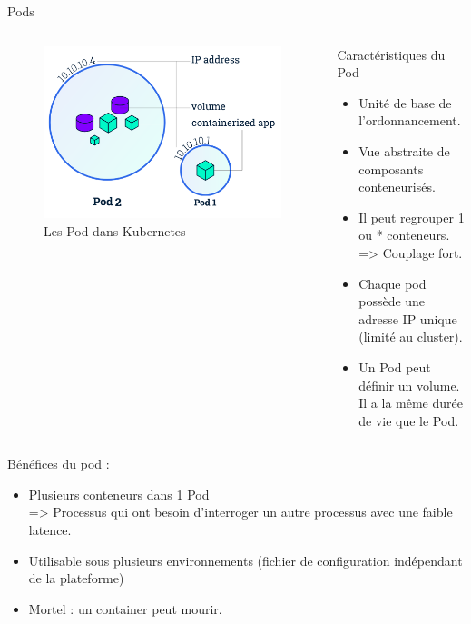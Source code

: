 \documentclass{bredelebeamer}
\begin{document}
\begin{frame}{Pods}

\begin{columns}
\begin{column}{0.5\textwidth}
\begin{figure}
\centering
\includegraphics[scale=0.25]{images/img7.png}
\caption{Les Pod dans Kubernetes}
\end{figure}
\end{column}
\begin{column}{0.5\textwidth}
\begin{block}{Caractéristiques du Pod}

\begin{itemize}
\item Unité de base de l'ordonnancement. 											\pause
\item Vue abstraite de composants conteneurisés.								\pause
\item Il peut regrouper 1 ou * conteneurs. \\=> Couplage fort.				\pause
\item Chaque pod possède une adresse IP unique (limité au cluster).		\pause
\item Un Pod peut définir un volume. 
		Il a la même durée de vie que le Pod.
\end{itemize}
\end{block}																							\pause
\end{column}



\end{columns}
\vspace{4px}
Bénéfices du pod : 
\begin{itemize}
\item Plusieurs conteneurs dans 1 Pod\\
=> Processus qui ont besoin d'interroger un autre processus avec une faible latence.		\pause
\item Utilisable sous plusieurs environnements (fichier de configuration indépendant de la plateforme)		\pause
\item Mortel : un container peut mourir.		\pause
\end{itemize}
\end{frame}
\end{document}
